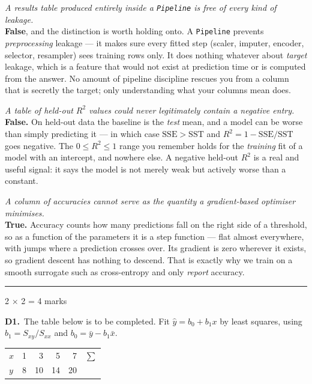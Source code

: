 \documentclass[10pt,a4paper]{article}
\newcommand{\parthead}[2]{\vspace{2pt}\noindent\rule{\linewidth}{0.4pt}\par\vspace{2pt}%
  \noindent{\bfseries Part #1}\hfill{\small #2}\par\vspace{1pt}}
\begin{document}
\begin{sC}

  \item \emph{A results table produced entirely inside a \texttt{Pipeline} is free of every kind of leakage.}\\[2pt] \textbf{False}, and the distinction is worth holding onto. A \texttt{Pipeline} prevents \emph{preprocessing} leakage --- it makes sure every fitted step (scaler, imputer, encoder, selector, resampler) sees training rows only. It does nothing whatever about \emph{target} leakage, which is a feature that would not exist at prediction time or is computed from the answer. No amount of pipeline discipline rescues you from a column that is secretly the target; only understanding what your columns mean does.

  \item \emph{A table of held-out $R^2$ values could never legitimately contain a negative entry.}\\[2pt] \textbf{False.} On held-out data the baseline is the \emph{test} mean, and a model can be worse than simply predicting it --- in which case $\mathrm{SSE} > \mathrm{SST}$ and $R^2 = 1 - \mathrm{SSE}/\mathrm{SST}$ goes negative. The $0 \le R^2 \le 1$ range you remember holds for the \emph{training} fit of a model with an intercept, and nowhere else. A negative held-out $R^2$ is a real and useful signal: it says the model is not merely weak but actively worse than a constant.

  \item \emph{A column of accuracies cannot serve as the quantity a gradient-based optimiser minimises.}\\[2pt] \textbf{True.} Accuracy counts how many predictions fall on the right side of a threshold, so as a function of the parameters it is a step function --- flat almost everywhere, with jumps where a prediction crosses over. Its gradient is zero wherever it exists, so gradient descent has nothing to descend. That is exactly why we train on a smooth surrogate such as cross-entropy and only \emph{report} accuracy.

\end{sC}

\newpage

\parthead{D --- Short answer}{2 $\times$ 2 = 4 marks}

\textbf{D1.}\ The table below is to be completed. Fit $\hat y = b_0 + b_1 x$ by least squares, using $b_1 = S_{xy}/S_{xx}$ and $b_0 = \bar y - b_1\bar x$.\par\vspace{1mm}\hspace*{6mm}\begin{tabular}{@{}lrrrr|r@{}}\hline\rule{0pt}{10pt}$x$ & 1 & 3 & 5 & 7 & $\sum$\\ $y$ & 8 & 10 & 14 & 20 & \\[1pt]\hline\end{tabular}
\end{document}

